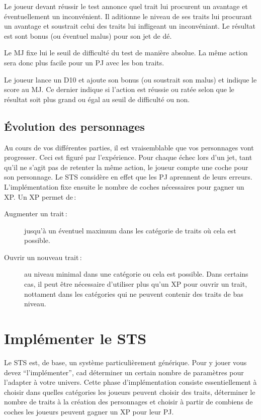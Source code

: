\documentclass[a4paper,10pt,twoside,twocolumn]{article}
\begin{document}
 Le joueur devant réussir le test annonce quel trait lui procurent un avantage et éventuellement un inconvénient. Il aditionne le niveau de ses traits lui procurant un avantage et soustrait celui des traits lui infligeant un inconvéniant. Le résultat est sont bonus (ou éventuel malus) pour son jet de dé.
 
 Le MJ fixe lui le seuil de difficulté du test de manière absolue. La même action sera donc plus facile pour un PJ avec les bon traits.
 
 Le joueur lance un D10 et ajoute son bonus (ou soustrait son malus) et indique le score au MJ. Ce dernier indique si l'action est réussie ou ratée selon que le résultat soit plus grand ou égal au seuil de difficulté ou non. 

 
 \subsection{Évolution des personnages}
 \label{rule::evolv}
 
 Au cours de vos différentes parties, il est vraisemblable que vos personnages vont progresser. Ceci est figuré par l'expérience. Pour chaque échec lors d'un jet, tant qu'il ne s'agit pas de retenter la même action, le joueur compte une coche pour son personnage. Le STS considère en effet que les PJ aprennent de leurs erreurs. L'implémentation fixe ensuite le nombre de coches nécessaires pour gagner un XP. Un XP permet de\,:
 
 \begin{description}
  \item[Augmenter un trait\,:] jusqu'à un éventuel maximum dans les catégorie de traits où cela est possible.
  \item[Ouvrir un nouveau trait\,:] au niveau minimal dans une catégorie ou cela est possible. Dans certains cas, il peut être nécessaire d'utiliser plus qu'un XP pour ouvrir un trait, nottament dans les catégories qui ne peuvent contenir des traits de bas niveau.
 \end{description}
 
 \section{Implémenter le STS}
 \label{implem}
 
 Le STS est, de base, un système particulièrement générique. Pour y jouer vous devez ``l'implémenter'', cad déterminer un certain nombre de paramètres pour l'adapter à votre univers. Cette phase d'implémentation consiste essentiellement à choisir dans quelles catégories les joueurs peuvent choisir des traits, déterminer le nombre de traits à la création des personnages et choisir à partir de combiens de coches les joueurs peuvent gagner un XP pour leur PJ.
 
\end{document}

